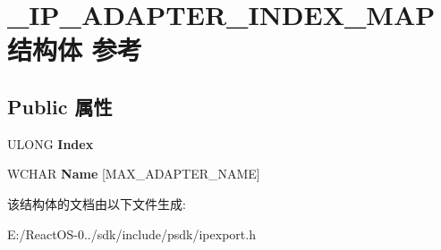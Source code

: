 \hypertarget{struct___i_p___a_d_a_p_t_e_r___i_n_d_e_x___m_a_p}{}\section{\+\_\+\+I\+P\+\_\+\+A\+D\+A\+P\+T\+E\+R\+\_\+\+I\+N\+D\+E\+X\+\_\+\+M\+A\+P结构体 参考}
\label{struct___i_p___a_d_a_p_t_e_r___i_n_d_e_x___m_a_p}
\subsection*{Public 属性}
\begin{DoxyCompactItemize}
\item 
\mbox{\label{struct___i_p___a_d_a_p_t_e_r___i_n_d_e_x___m_a_p_a63ac88c62dd28dddc4f695ac7beeba55}} 
U\+L\+O\+NG {\bfseries Index}
\item 
\mbox{\label{struct___i_p___a_d_a_p_t_e_r___i_n_d_e_x___m_a_p_aabc3b9eedd361cf4dfbb16045cddb03a}} 
W\+C\+H\+AR {\bfseries Name} \mbox{[}M\+A\+X\+\_\+\+A\+D\+A\+P\+T\+E\+R\+\_\+\+N\+A\+ME\mbox{]}
\end{DoxyCompactItemize}


该结构体的文档由以下文件生成\+:\begin{DoxyCompactItemize}
\item 
E\+:/\+React\+O\+S-\/0../sdk/include/psdk/ipexport.\+h\end{DoxyCompactItemize}
